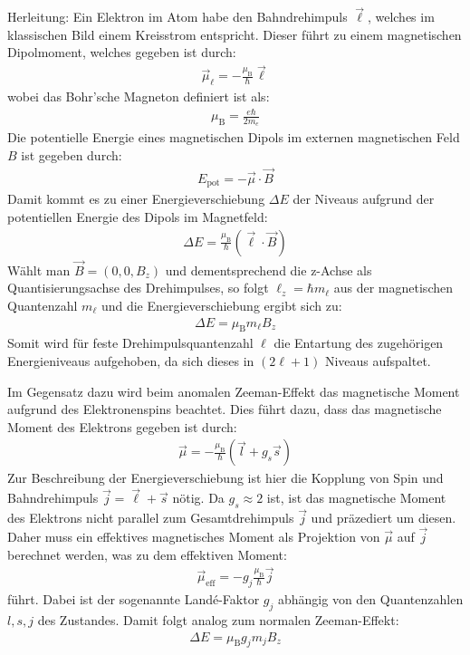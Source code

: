 \documentclass[11pt, a4paper]{article}
\begin{document}
Herleitung:
Ein Elektron im Atom habe den Bahndrehimpuls $\vec{\ell}$, welches im klassischen Bild einem Kreisstrom entspricht.
Dieser führt zu einem magnetischen Dipolmoment, welches gegeben ist durch:
\begin{align}
	\vec{\mu}_\ell = - \frac{\mu_\mathrm{B}}{\hbar} \vec{\ell}
\end{align}
wobei das Bohr'sche Magneton definiert ist als:
\begin{align}
	\mu_\mathrm{B} = \frac{e \hbar}{2 m_e}
\end{align}
Die potentielle Energie eines magnetischen Dipols im externen magnetischen Feld $B$ ist gegeben durch:
\begin{align}
	E_\mathrm{pot} = - \vec{\mu} \cdot \vec{B}
\end{align}
Damit kommt es zu einer Energieverschiebung $\Delta E$ der Niveaus aufgrund der potentiellen Energie des Dipols im Magnetfeld:
\begin{align}
	\Delta E = \frac{\mu_\mathrm{B}}{\hbar} \left( \vec{\ell} \cdot \vec{B} \right)
\end{align}
Wählt man $\vec{B} = (0,0,B_z)$ und dementsprechend die z-Achse als Quantisierungsachse des Drehimpulses, so folgt $\ell_z = \hbar m_\ell$ aus der magnetischen Quantenzahl $m_\ell$ und die Energieverschiebung ergibt sich zu:
\begin{align}
	\Delta E = \mu_\mathrm{B} m_\ell B_z
\end{align}
Somit wird für feste Drehimpulsquantenzahl $\ell$ die Entartung des zugehörigen Energieniveaus aufgehoben, da sich dieses in $(2\ell + 1)$ Niveaus aufspaltet.

Im Gegensatz dazu wird beim anomalen Zeeman-Effekt das magnetische Moment aufgrund des Elektronenspins beachtet.
Dies führt dazu, dass das magnetische Moment des Elektrons gegeben ist durch:
\begin{align}
\vec{\mu} = -\frac{\mu_\mathrm{B}}{\hbar} \left( \vec{l} + g_s \vec{s} \right)
\end{align}
Zur Beschreibung der Energieverschiebung ist hier die Kopplung von Spin und Bahndrehimpuls $\vec{j} = \vec{\ell} + \vec{s}$ nötig.
Da $g_s \approx 2$ ist, ist das magnetische Moment des Elektrons nicht parallel zum Gesamtdrehimpuls $\vec{j}$ und präzediert um diesen.
Daher muss ein effektives magnetisches Moment als Projektion von $\vec{\mu}$ auf $\vec{j}$ berechnet werden, was zu dem effektiven Moment:
\begin{align}
	\vec{\mu}_\mathrm{eff} = - g_j \frac{\mu_\mathrm{B}}{\hbar} \vec{j} 
\end{align}
führt.
Dabei ist der sogenannte Landé-Faktor $g_j$ abhängig von den Quantenzahlen $l,s,j$ des Zustandes.
Damit folgt analog zum normalen Zeeman-Effekt:
\begin{align}
	\Delta E = \mu_\mathrm{B} g_j m_j B_z
\end{align}
\end{document}
